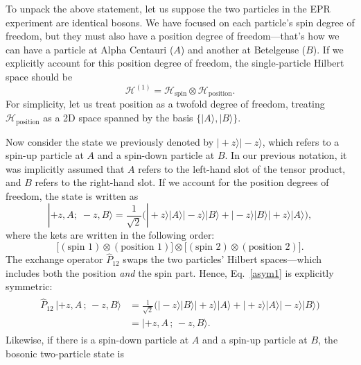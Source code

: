 \documentclass[pra,12pt]{revtex4}
\begin{document}
To unpack the above statement, let us suppose the two particles in the
EPR experiment are identical bosons.  We have focused on each
particle's spin degree of freedom, but they must also have a position
degree of freedom---that's how we can have a particle at Alpha
Centauri ($A$) and another at Betelgeuse ($B$).  If we explicitly
account for this position degree of freedom, the single-particle
Hilbert space should be
\begin{equation}
  \mathscr{H}^{(1)} = \mathscr{H}_{\mathrm{spin}} \otimes \mathscr{H}_{\mathrm{position}}.
\end{equation}
For simplicity, let us treat position as a twofold degree of freedom,
treating $\mathscr{H}_{\mathrm{position}}$ as a 2D space spanned by
the basis $\{|A\rangle, |B\rangle\}$.

Now consider the state we previously denoted by $|\!+\!z\rangle
|\!-\!z\rangle$, which refers to a spin-up particle at $A$ and a
spin-down particle at $B$.  In our previous notation, it was
implicitly assumed that $A$ refers to the left-hand slot of the tensor
product, and $B$ refers to the right-hand slot.  If we account for the
position degrees of freedom, the state is written as
\begin{equation}
  |+\!z, A;\; -z, B\rangle = \frac{1}{\sqrt{2}}
  \Big(|\!+\!z\rangle|A\rangle |\!-\!z\rangle|B\rangle
  + |\!-\!z\rangle|B\rangle |\!+\!z\rangle|A\rangle \Big),
  \label{asym1}
\end{equation}
where the kets are written in the following order:
\begin{equation}
  \Big[
    (\textrm{spin 1}) \otimes (\textrm{position 1}) \Big]
  \otimes
  \Big[
    (\textrm{spin 2}) \otimes (\textrm{position 2}) \Big].
  \label{order1}
\end{equation}
The exchange operator $\hat{P}_{12}$ swaps the two particles' Hilbert
spaces---which includes both the position \textit{and} the spin part.
Hence, Eq.~\eqref{asym1} is explicitly symmetric:
\begin{align}
  \begin{aligned}
  \hat{P}_{12} \, |+\!z, A\,;\, -z, B\rangle &= \frac{1}{\sqrt{2}}
  \Big(|\!-\!z\rangle|B\rangle |\!+\!z\rangle|A\rangle
  + |\!+\!z\rangle|A\rangle |\!-\!z\rangle|B\rangle \Big) \\
  &= |+\!z, A\,;\, -z, B\rangle.
  \end{aligned}
\end{align}
Likewise, if there is a spin-down particle at $A$ and a spin-up
particle at $B$, the bosonic two-particle state is
\end{document}
